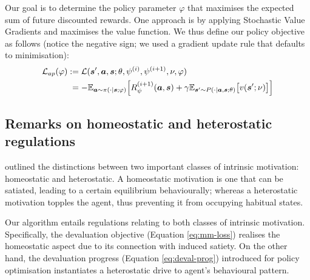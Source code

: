 \documentclass[utf8]{frontiersSCNS}
\newcommand{\bs}{\boldsymbol}
\begin{document}
Our goal is to determine the policy parameter $\varphi$ that maximises the expected sum of future discounted rewards. One approach is by applying Stochastic Value Gradients \citep{svg} and maximises the value function. We thus define our policy objective as follows (notice the negative sign; we used a gradient update rule that defaults to minimisation):
%
	\begin{equation}
	\begin{aligned} \label{eq:policy-loss}
	\mathcal{L}_{ap}(\varphi) 
		&:=
		\mathcal{L}(\bs{s}^\prime, \bs{a}, \bs{s}; \theta, \psi^{(i)}, \psi^{(i+1)}, \nu, \varphi) \\
		&\phantom{:}= - 
		\mathbb{E}_{\bs{a} \sim \pi(\cdot | \bs{s}; \varphi)} 
		\Bigl[ 
		R_\psi^{(i+1)}(\bs{a}, \bs{s}) + \gamma 
		\mathbb{E}_{\bs{s}^\prime \sim P(\cdot |\bs{a}, \bs{s}; \theta)}
		\bigl[ v(\bs{s}^\prime; \nu) \bigr] 
		\Bigr] \\
	\end{aligned}
	\end{equation}

\subsection{Remarks on homeostatic and heterostatic regulations} \label{subsec:homeohetero}

\citet{intrinsicmotiv} outlined the distinctions between two important classes of intrinsic motivation: homeostatic and heterostatic. A homeostatic motivation is one that can be satiated, leading to a certain equilibrium behaviourally; whereas a heterostatic motivation topples the agent, thus preventing it from occupying habitual states.

Our algorithm entails regulations relating to both classes of intrinsic motivation. Specifically, the devaluation objective (Equation \ref{eq:mm-loss}) realises the homeostatic aspect due to its connection with induced satiety. On the other hand, the devaluation progress (Equation \ref{eq:deval-prog}) introduced for policy optimisation instantiates a heterostatic drive to agent's behavioural pattern.
\end{document}
